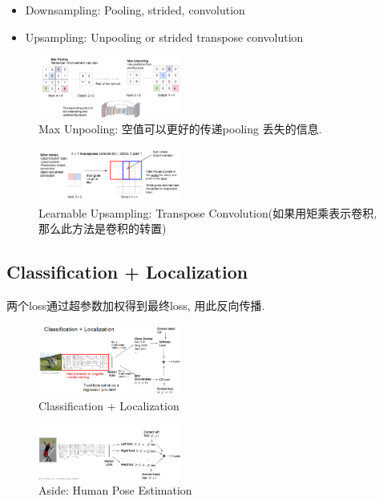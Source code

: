 \begin{itemize}
    \item Downsampling: Pooling, strided, convolution
    \item Upsampling: Unpooling or strided transpose convolution
\end{itemize}

\begin{figure}[!htb]
    \centering
    \includegraphics[width=0.42\textwidth]{pic/lec11/Max Unpooling.png}
    \caption{Max Unpooling: 空值可以更好的传递pooling 丢失的信息.}
\end{figure}

\begin{figure}[!htb]
    \centering
    \includegraphics[width=0.42\textwidth]{pic/lec11/Transpose Convolution}
    \caption{Learnable Upsampling: Transpose Convolution(如果用矩乘表示卷积, 那么此方法是卷积的转置)}
\end{figure}

\subsection{Classification + Localization}
两个loss通过超参数加权得到最终loss, 用此反向传播. 

\begin{figure}[!htb]
    \centering
    \includegraphics[width=0.42\textwidth]{pic/lec11/Classification + Localization}
    \caption{Classification + Localization}
\end{figure}
\begin{figure}[!htb]
    \centering
    \includegraphics[width=0.42\textwidth]{pic/lec11/Aside Human Pose Estimation}
    \caption{Aside: Human Pose Estimation}
\end{figure}

